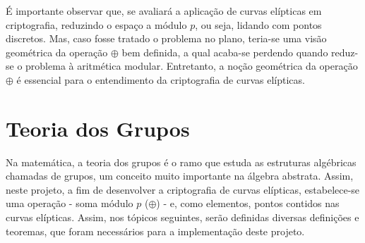 \documentclass[14pt, oneside]{book}
\newcommand\tab[1][1cm]{\hspace*{#1}}
\theoremstyle{definition}
\begin{document}
                \tab É importante observar que, se avaliará a aplicação de curvas elípticas em criptografia, reduzindo o espaço a módulo $p$, ou seja, lidando com pontos discretos. Mas, caso fosse tratado o problema no plano, teria-se uma visão geométrica da operação $\oplus$ bem definida, a qual acaba-se perdendo quando reduz-se o problema à aritmética modular. Entretanto, a noção geométrica da operação $\oplus$ é essencial para o entendimento da criptografia de curvas elípticas. 
                
            

        \chapter{Teoria dos Grupos}
                \tab Na matemática, a teoria dos grupos é o ramo que estuda as estruturas algébricas chamadas de grupos, um conceito muito importante na álgebra abstrata. Assim, neste projeto, a fim de desenvolver a criptografia de curvas elípticas, estabelece-se uma operação - soma módulo $p$ ($\oplus$) - e, como elementos, pontos contidos nas curvas elípticas. Assim, nos tópicos seguintes, serão definidas diversas definições e teoremas, que foram necessários para a implementação deste projeto.
\end{document}
